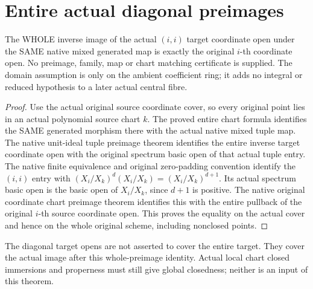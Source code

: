 \section{Entire actual diagonal preimages}
\begin{lemma}
\label{lem:central-embedding-same-mixed-map-entire-diagonal-preimages}
\leanok
The WHOLE inverse image of the actual $(i,i)$ target coordinate open under
the SAME native mixed generated map is exactly the original $i$-th coordinate
open. No preimage, family, map or chart matching certificate is supplied.
The domain assumption is only on the ambient coefficient ring; it adds no
integral or reduced hypothesis to a later actual central fibre.
\end{lemma}
\begin{proof}
Use the actual original source coordinate cover, so every original point lies
in an actual polynomial source chart $k$. The proved entire chart formula
identifies the SAME generated morphism there with the actual native mixed
tuple map. The native unit-ideal tuple preimage theorem identifies the entire
inverse target coordinate open with the original spectrum basic open of that
actual tuple entry. The native finite equivalence and original zero-padding
convention identify the $(i,i)$ entry with
$(X_i/X_k)^d(X_i/X_k)=(X_i/X_k)^{d+1}$. Its actual spectrum basic open is the
basic open of $X_i/X_k$, since $d+1$ is positive. The native original coordinate
chart preimage theorem identifies this with the entire pullback of the
original $i$-th source coordinate open. This proves the equality on the actual
cover and hence on the whole original scheme, including nonclosed points.
\end{proof}
The diagonal target opens are not asserted to cover the entire target. They
cover the actual image after this whole-preimage identity. Actual local chart
closed immersions and properness must still give global closedness; neither
is an input of this theorem.
